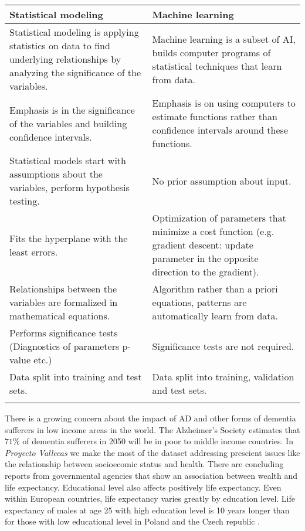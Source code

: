 \documentclass[11pt]{article}
\theoremstyle{definition}
\theoremstyle{remark}
\begin{document}
\begin{tabularx}{1\linewidth}{|X | X|}
\hline
Statistical modeling    & Machine learning  \\
\hline
Statistical modeling is applying statistics on data to find underlying relationships by analyzing the significance of the variables.  & Machine learning is a subset of AI, builds computer programs of statistical techniques that learn from data. \\
Emphasis is in the significance of the variables and building confidence intervals. & Emphasis is on using computers to estimate functions rather than confidence intervals around these functions.\\
Statistical models start with assumptions about the variables, perform hypothesis testing. & No prior assumption about input. \\
Fits the hyperplane with the least errors. & Optimization of parameters that minimize a cost function (e.g. gradient descent: update parameter in the opposite direction to the gradient). \\
Relationships between the variables are formalized in mathematical equations.& Algorithm rather than a priori equations, patterns are automatically learn from data.\\
Performs significance tests (Diagnostics of parameters p-value etc.)& Significance tests are not required.\\
Data split into training and test sets. & Data split into training, validation and test sets. \\ %
\label{tab:smml}
\end{tabularx}












There is a growing concern about the impact of AD and other forms of dementia sufferers in low income areas in the world.
The Alzheimer’s Society estimates that $71\%$ of dementia sufferers in 2050 will be in poor to middle income countries.
In \emph{Proyecto Vallecas} we make the most of the dataset addressing prescient issues like the relationship between socioecomic status and health. There are concluding reports from governmental agencies that show an association between wealth and life expectancy. 
Educational level also affects positively life expectancy. Even within European countries, life expectancy varies greatly by education level. Life expectancy of males at age 25 with high education level is 10 years longer than for those with low educational level in Poland and the Czech republic \cite{imf2018}. 
\end{document}
